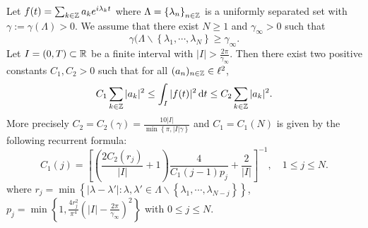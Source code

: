 \begin{theorem}\label{thm-3}
  Let $f(t)=\sum_{k\in \mathbb{Z}}^{} a_ke^{ i\lambda_k t}$ where $\Lambda=\left\{\lambda_n\right\} _{n\in \mathbb{Z}}$ is a uniformly separated set with $\gamma:=\gamma(\Lambda)>0$. We assume that there exist $N\ge 1$ and $\gamma_{\infty}>0$ such that 
  \begin{equation}
    \gamma(\Lambda\backslash \left\{\lambda_{1},\cdots ,\lambda_{N}\right\}\ge \gamma_{\infty}.  
  \end{equation}
  Let $I=(0,T)\subset \mathbb{R}$ be a finite interval with $|I|>\frac{2\pi}{\gamma_{\infty}}$. Then there exist two positive constants $C_1,C_2>0$ such that for all  $(a_n)_{n\in \mathbb{Z}} \in \ell^2$,
  \begin{equation}\label{ingham}
    C_1 \sum_{k\in \mathbb{Z}} |a_k|^2\le \int_{I}|f(t)|^2\,\mathrm{d} t\le C_2 \sum_{k\in \mathbb{Z}}^{} |a_k|^2.
  \end{equation}
  More precisely $C_2=C_2(\gamma)= \frac{10 |I|}{\min \left\{\pi,|I|\gamma \right\} }$ and $C_1=C_1(N)$ is given by the following recurrent formula:
  \begin{equation}\label{recurrent}
    C_1(j)=\left[ \left( \frac{2C_2(r_j)}{|I|}+1 \right) \frac{4}{C_1(j-1)p_j}+\frac{2}{|I|} \right] ^{-1},\quad 1\le j \le N.
  \end{equation}
  where $r_j=\min \left\{|\lambda-\lambda'|:\lambda,\lambda' \in \Lambda \backslash \left\{\lambda_1,\cdots ,\lambda_{N-j}\right\} \right\} $, $p_j=\min \left\{1, \frac{4r_j^2}{\pi^4}\left( |I|-\frac{2\pi}{\gamma_{\infty}} \right) ^2\right\} $ with $0\le j\le N$.
\end{theorem}
\iffalse
